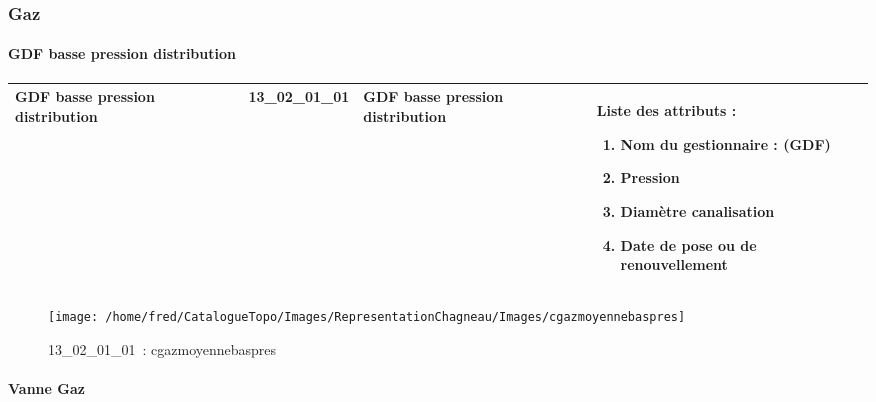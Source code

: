 \documentclass[12pt,titlepage]{book}
\begin{document}
\subsubsection{\large Gaz}
\paragraph{GDF basse pression distribution}
\noindent
\vspace{\baselineskip}

\renewcommand{\arraystretch}{1.2}
\begin{supertabular}{|p{10cm}|c|p{13cm}|p{12cm}|}
 GDF basse pression distribution & 13\_02\_01\_01 & GDF basse pression distribution & Liste des attributs :
\begin{enumerate}
  \item Nom du gestionnaire : (GDF)  \item Pression  \item Diamètre canalisation  \item Date de pose ou de renouvellement\end{enumerate}
\\
\hline
\end{supertabular}
\begin{figure}[h!]
  \hfill         %
  \begin{minipage}[t]{3cm}
    \begin{center}
      \texttt{[image: /home/fred/CatalogueTopo/Images/RepresentationChagneau/Images/cgazmoyennebaspres]}
      \caption[~13\_02\_01\_01]{\small{13\_02\_01\_01~:} \tiny{cgazmoyennebaspres}}\label{cgazmoyennebaspres}
    \end{center}
  \end{minipage}
\end{figure}


\paragraph{Vanne Gaz}
\noindent
\vspace{\baselineskip}
\end{document}
